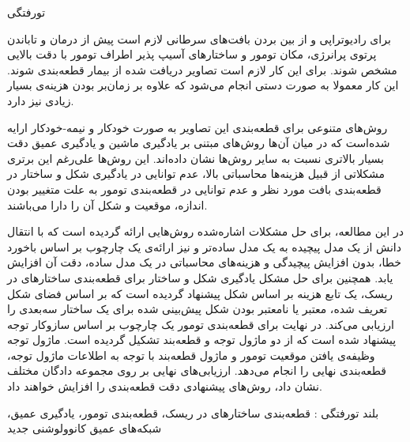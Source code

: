 


\pagestyle{empty}

‌تورفتگی

برای رادیوتراپی و از بین بردن بافت‌های سرطانی لازم است پیش از درمان و تاباندن پرتوی پرانرژی، مکان تومور و ساختارهای آسیپ پذیر اطراف تومور با دقت بالایی مشخص شوند. برای این کار لازم است تصاویر دریافت شده از بیمار قطعه‌بندی شوند. این کار معمولا به صورت دستی انجام می‌شود که علاوه بر زمان‌بر بودن هزینه‌ی بسیار زیادی نیز دارد. 

روش‌های متنوعی برای قطعه‌بندی این تصاویر به صورت خودکار و نیمه-خودکار ارایه شده‌است که در میان آن‌ها روش‌های مبتنی بر یادگیری ماشین و یادگیری عمیق دقت بسیار بالاتری نسبت به سایر روش‌ها نشان داده‌اند. این روش‌ها علی‌رغم این برتری مشکلاتی از قبیل هزینه‌ها محاسباتی بالا، عدم توانایی در یادگیری شکل و ساختار در قطعه‌بندی بافت مورد نظر و عدم توانایی در قطعه‌بندی تومور به علت متغییر بودن اندازه، موقعیت و شکل آن را دارا می‌باشند. 

در این مطالعه، برای حل مشکلات اشاره‌شده روش‌هایی ارائه گردیده است که با انتقال دانش از یک مدل پیچیده به یک مدل ساده‌تر و نیز ارائه‌ی یک چارچوب بر اساس باخورد خطا، بدون افزایش پیچیدگی و هزینه‌های محاسباتی در یک مدل ساده، دقت آن افزایش یابد. همچنین برای حل مشکل یادگیری شکل و ساختار برای قطعه‌بندی ساختارهای در ریسک، یک تابع هزینه بر اساس شکل پیشنهاد گردیده است که بر اساس فضای شکل تعریف شده، معتبر یا نامعتبر بودن شکل پیش‌بینی شده برای یک ساختار سه‌بعدی را ارزیابی می‌کند. در نهایت برای قطعه‌بندی تومور یک چارچوب بر اساس سازوکار توجه پیشنهاد شده است که از دو ماژول توجه و قطعه‌بند تشکیل گردیده است. ماژول توجه وظیفه‌ی یافتن موقعیت تومور و ماژول قطعه‌بند با توجه به اطلاعات ماژول توجه، قطعه‌بندی نهایی را انجام می‌دهد. ارزیابی‌های نهایی بر روی مجموعه دادگان مختلف نشان داد، روش‌های پیشنهادی دقت قطعه‌بندی را افزایش خواهند داد.


‌بلند
‌تورفتگی : 
قطعه‌بندی ساختار‌های در ریسک، قطعه‌بندی تومور، یادگیری عمیق، شبکه‌های عمیق کانوولوشنی
‌جدید
